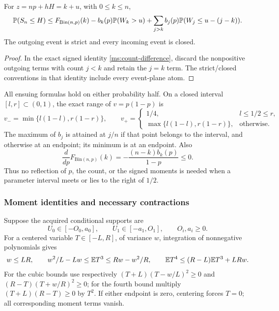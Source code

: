 \begin{lemma}
\label{ms:finite:countcore:countidentity}
For \(z=np+hH=k+u\), with \(0\le k\le n\),
\begin{equation}
 \mathbb P(S_n\le H)
 \le F_{\mathrm{Bin}(n,p)}(k)-b_k(p)\mathbb P(W_k>u)
       +\sum_{j>k}b_j(p)\mathbb P(W_j\le u-(j-k)).
 \label{ms:finite:countcore:countineq}
\end{equation}
The outgoing event is strict and every incoming event is closed.
\end{lemma}
\begin{proof}
In the exact signed identity \eqref{ms:count-difference}, discard the
nonpositive outgoing terms with count $j<k$ and retain the $j=k$ term.
The strict/closed conventions in that identity include every event-plane atom.
\end{proof}

All ensuing formulas hold on either probability half. On a closed interval
\([l,r]\subset(0,1)\), the exact range of \(v=p(1-p)\) is
\[
 v_- =\min\{l(1-l),r(1-r)\},\qquad
 v_+=\begin{cases}1/4,&l\le1/2\le r,\\
                  \max\{l(1-l),r(1-r)\},&\text{otherwise}.
       \end{cases}
\]
The maximum of \(b_j\) is attained at \(j/n\) if that point belongs
to the interval, and otherwise at an endpoint; its minimum is at an
endpoint. Also
\[
 \frac{d}{dp}F_{\mathrm{Bin}(n,p)}(k)
 =-\frac{(n-k)b_k(p)}{1-p}\le0.
\]
Thus no reflection of \(p\), the count, or the signed moments is needed
when a parameter interval meets or lies to the right of \(1/2\).

\subsubsection{Moment identities and necessary contractions}

Suppose the acquired conditional supports are
\begin{equation}
 U_0\in[-O_0,a_0],\qquad U_1\in[-a_1,O_1],
 \qquad O_i,a_i\ge0.
 \label{ms:finite:countcore:support}
\end{equation}
For a centered variable \(T\in[-L,R]\), of variance \(w\),
integration of nonnegative polynomials gives
\begin{equation}
 w\le LR,\qquad
 w^2/L-Lw\le\mathbb E T^3\le Rw-w^2/R,
 \qquad \mathbb E T^4\le(R-L)\mathbb E T^3+LRw.
 \label{ms:finite:countcore:momentbounds}
\end{equation}
For the cubic bounds use respectively
\((T+L)(T-w/L)^2\ge0\) and
\((R-T)(T+w/R)^2\ge0\); for the fourth bound multiply
\((T+L)(R-T)\ge0\) by \(T^2\). If either endpoint is zero,
centering forces \(T=0\); all corresponding moment terms vanish.

